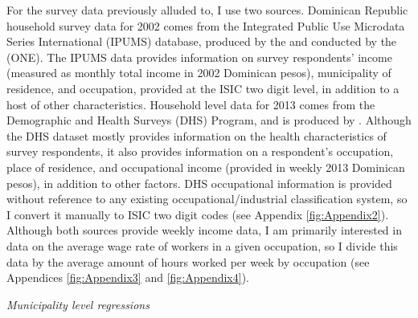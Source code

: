 For the survey data previously alluded to, I use two sources. 
Dominican Republic household survey data for 2002 comes from the 
Integrated Public Use Microdata Series International
(IPUMS) database, produced by the \citet{ipumsi} and conducted by the
\citet{one} (ONE). The IPUMS data provides information on 
survey respondents' income (measured as monthly total income in
2002 Dominican pesos), municipality of residence, and occupation,
provided at the ISIC two digit level, in addition to a host of other characteristics.
Household level data for 2013 comes from the 
Demographic and Health Surveys (DHS) Program, and is produced by \citet{dhs}.
Although the DHS dataset mostly provides information on the health 
characteristics of survey respondents, it also provides 
information on a respondent's occupation, place of residence,
and occupational income (provided in weekly 2013 Dominican pesos), in addition to other factors. 
DHS occupational information is provided without reference to any existing occupational/industrial 
classification system, so I convert it manually to
ISIC two digit codes (see Appendix \ref{fig:Appendix2}).
Although both sources provide weekly income data, I am primarily interested in data
on the average wage rate of workers in a given occupation, so I divide this data by the average 
amount of hours worked per week by occupation (see Appendices \ref{fig:Appendix3} and 
\ref{fig:Appendix4}). %

\textit{Municipality level regressions}

